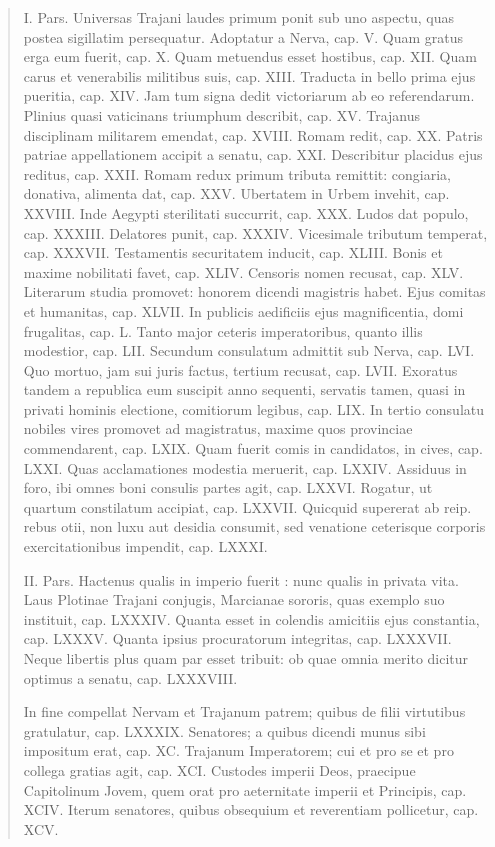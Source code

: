 \begin{quotation}
{I. Pars. Universas Trajani laudes primum ponit sub uno aspectu, quas postea sigillatim persequatur. Adoptatur a Nerva, cap. V. Quam gratus erga eum fuerit, cap. X. Quam metuendus esset hostibus, cap. XII. Quam carus et venerabilis militibus suis, cap. XIII. Traducta in bello prima ejus pueritia, cap. XIV. Jam tum signa dedit victoriarum ab eo referendarum. Plinius quasi vaticinans triumphum describit, cap. XV. Trajanus disciplinam militarem emendat, cap. XVIII. Romam redit, cap. XX. Patris patriae appellationem accipit a senatu, cap. XXI. Describitur placidus ejus reditus, cap. XXII. Romam redux primum tributa remittit: congiaria, donativa, alimenta dat, cap. XXV. Ubertatem in Urbem invehit, cap. XXVIII. Inde Aegypti sterilitati succurrit, cap. XXX. Ludos dat populo, cap. XXXIII. Delatores punit, cap. XXXIV. Vicesimale tributum temperat, cap. XXXVII. Testamentis securitatem inducit, cap. XLIII. Bonis et maxime nobilitati favet, cap. XLIV. Censoris nomen recusat, cap. XLV. Literarum studia promovet: honorem dicendi magistris habet. Ejus comitas et humanitas, cap. XLVII. In publicis aedificiis ejus magnificentia, domi frugalitas, cap. L. Tanto major ceteris imperatoribus, quanto illis modestior, cap. LII. Secundum consulatum admittit sub Nerva, cap. LVI. Quo mortuo, jam sui juris factus, tertium recusat, cap. LVII. Exoratus tandem a republica eum suscipit anno sequenti, servatis tamen, quasi in privati hominis electione, comitiorum legibus, cap. LIX. In tertio consulatu nobiles vires promovet ad magistratus, maxime quos provinciae commendarent, cap. LXIX. Quam fuerit comis in candidatos, in cives, cap. LXXI. Quas acclamationes modestia meruerit, cap. LXXIV. Assiduus in foro, ibi omnes boni consulis partes agit, cap. LXXVI. Rogatur, ut quartum constilatum accipiat, cap. LXXVII. Quicquid supererat ab reip. rebus otii, non luxu aut desidia consumit, sed venatione ceterisque corporis exercitationibus impendit, cap. LXXXI. 

II. Pars. Hactenus qualis in imperio fuerit : nunc qualis in privata vita. Laus Plotinae Trajani conjugis, Marcianae sororis, quas exemplo suo instituit, cap. LXXXIV. Quanta esset in colendis amicitiis ejus constantia, cap. LXXXV. Quanta ipsius procuratorum integritas, cap. LXXXVII. Neque libertis plus quam par esset tribuit: ob quae omnia merito dicitur optimus a senatu, cap. LXXXVIII.

In fine compellat Nervam et Trajanum patrem; quibus de filii virtutibus gratulatur, cap. LXXXIX. Senatores; a quibus dicendi munus sibi impositum erat, cap. XC. Trajanum Imperatorem; cui et pro se et pro collega gratias agit, cap. XCI. Custodes imperii Deos, praecipue Capitolinum Jovem, quem orat pro aeternitate imperii et Principis, cap. XCIV. Iterum senatores, quibus obsequium et reverentiam pollicetur, cap. XCV. 
}
\end{quotation}



